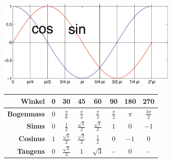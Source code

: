 \documentclass[a4paper]{article}
\begin{document}
\begin{appendix}
\begin{multicols}{2}
	
	
			\includegraphics[width=9cm]{sincos.png}
			
			\vspace{4mm}
			\renewcommand{\arraystretch}{1.6}
			\begin{tabular}{r|ccccccc}
			\textbf{Winkel}     &\textbf{0}    &\textbf{30}            &\textbf{45}    &\textbf{60}    &\textbf{90}     &\textbf{180}  &\textbf{270}\\\hline
			\textbf{Bogenmass}  &$0$           &$\frac{\pi}{6}$        &$\frac{\pi}{4}$&$\frac{\pi}{3}$&$\frac{\pi}{2}$&$\pi$          &$\frac{3\pi}{2}$\\\hline
			\textbf{Sinus}      &$0$           &$\frac{1}{2}$          &$\frac{\sqrt{2}}{2}$&$\frac{\sqrt{3}}{2}$&$1$  &$0$            &$-1$\\
			\textbf{Cosinus}    &$1$           &$\frac{\sqrt{3}}{2}$   &$\frac{\sqrt{2}}{2}$&$\frac{1}{2}$&$0$    &$-1$           &$0$\\
			\textbf{Tangens}    &$0$           &$\frac{\sqrt{3}}{3}$   &$1$       &$\sqrt{3}$     &-              &$0$            &-\\
			\end{tabular}
% 		
		

\end{multicols}
\end{appendix}
\end{document}
